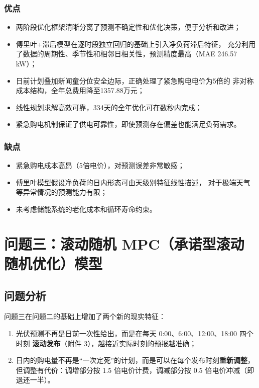 \documentclass[12pt,a4paper]{article}
\begin{document}
\subsubsection{优点}
\begin{itemize}
    \item 两阶段优化框架清晰分离了预测不确定性和优化决策，便于分析和改进；
    \item 傅里叶+滞后模型在逐时段独立回归的基础上引入净负荷滞后特征，
          充分利用了数据的周期性、季节性和相邻日相关性，预测精度最高（MAE 246.57 kW）；
    \item 日前计划叠加新闻童分位安全边际，正确处理了紧急购电电价为5倍的
          非对称成本结构，全年总费用降至1357.88万元；
    \item 线性规划求解高效可靠，334天的全年优化可在数秒内完成；
    \item 紧急购电机制保证了供电可靠性，即使预测存在偏差也能满足负荷需求。
\end{itemize}

\subsubsection{缺点}
\begin{itemize}
    \item 紧急购电成本高昂（5倍电价），对预测误差非常敏感；
    \item 傅里叶模型假设净负荷的日内形态可由天级别特征线性描述，
          对于极端天气等异常情况的预测能力有限；
    \item 未考虑储能系统的老化成本和循环寿命约束。
\end{itemize}

\section{问题三：滚动随机 MPC（承诺型滚动随机优化）模型}

\subsection{问题分析}

问题三在问题二的基础上增加了两个新的现实特征：
\begin{enumerate}
    \item 光伏预测不再是日前一次性给出，而是在每天 0:00、6:00、12:00、18:00 四个时刻
          \textbf{滚动发布}（附件 3），越接近实际时刻的预报越准确；
    \item 日内的购电量不再是“一次定死”的计划，而是可以在每个发布时刻\textbf{重新调整}，
          但调整有代价：调增部分按 1.5 倍电价计费，调减部分按 0.5 倍电价冲减（即退还一半）。
\end{enumerate}
\end{document}
